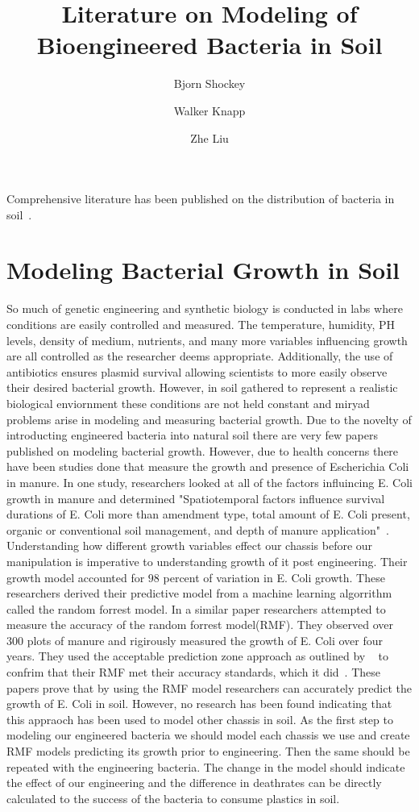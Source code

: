 \documentclass[journal = bichaw, biochem=true]{achemso}
\title{Literature on Modeling of Bioengineered Bacteria in Soil}
\author[1]{Bjorn Shockey}
\author[1]{Walker Knapp}
\author[1]{Zhe Liu}
\affil[1]{College of William and Mary}
\begin{document}

    Comprehensive literature has been published on the distribution of bacteria in soil~\cite{TimsinaRameshChandra2021AMMf}.



    \section{Modeling Bacterial Growth in Soil}\label{sec:modeling-bacterial-growth-in-soil}
    So much of genetic engineering and synthetic biology is conducted in labs where conditions are easily controlled and measured. The
    temperature, humidity, PH levels, density of medium, nutrients, and many more variables influencing growth are all controlled as the 
    researcher deems appropriate. Additionally, the use of antibiotics ensures plasmid survival allowing scientists to more easily 
    observe their desired bacterial growth. However, in soil gathered to represent a realistic biological enviornment these conditions 
    are not held constant and miryad problems arise in modeling and measuring bacterial growth. 
    Due to the novelty of introducting engineered bacteria into natural soil there are very few papers published on modeling bacterial 
    growth. However, due to health concerns there have been studies done that measure the growth and presence of Escherichia Coli in 
    manure. In one study, researchers looked at all of the factors influincing E. Coli growth in manure and determined "Spatiotemporal 
    factors influence survival durations of E. Coli more than amendment type, total amount of E. Coli present, organic or conventional 
    soil management, and depth of manure application"~\cite{SharmaManan2019SoEc}. Understanding how different growth variables effect our 
    chassis before our manipulation is imperative to understanding growth of it post engineering. Their growth model accounted for $98$ 
    percent of variation in E. Coli growth. These researchers derived their predictive model from a machine learning algorrithm called 
    the random forrest model. In a similar paper researchers attempted to measure the accuracy of the random forrest model(RMF). They 
    observed over $300$ plots of manure and rigirously measured the growth of E. Coli over four years. They used the acceptable 
    prediction zone approach as outlined by ~\cite{OscarThomasE2005VoLT} to confrim that their RMF met their accuracy standards, which it 
    did~\cite{PangHao2020APMf}. These papers prove that by using the RMF model researchers can accurately predict the growth of E. Coli 
    in soil. However, no research has been found indicating that this appraoch has been used to model other chassis in soil. As the first 
    step to modeling our engineered bacteria we should model each chassis we use and create RMF models predicting its growth prior to 
    engineering. Then the same should be repeated with the engineering bacteria. The change in the model should indicate the effect of 
    our engineering and the difference in deathrates can be directly calculated to the success of the bacteria to consume plastics in 
    soil. 
    
\end{document}
